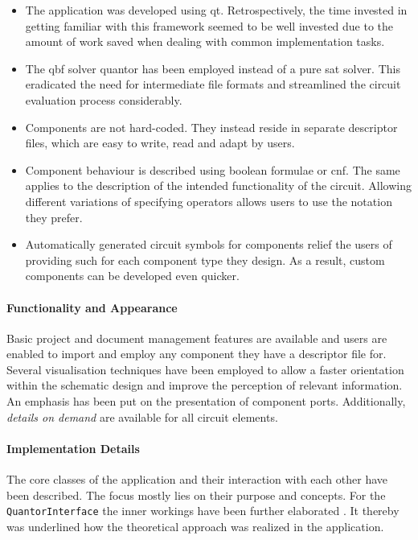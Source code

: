 	 \begin{itemize}
	 
	 \item The application was developed using \gls{qt}.
	 	Retrospectively, the time invested in getting familiar with this framework seemed to be well invested due to the amount of work saved when dealing with common implementation tasks.
	 	
	 \item The \gls{qbf} solver \gls{quantor} has been employed instead of a pure \gls{sat} solver.
	 	This eradicated the need for intermediate file formats and streamlined the circuit evaluation process considerably.
	 
	 \item Components are not hard-coded.
	 	They instead reside in separate descriptor files, which are easy to write, read and adapt by users.
	 	
	 \item Component behaviour is described using boolean formulae or \gls{cnf}.
	 The same applies to the description of the intended functionality of the circuit.
	 Allowing different variations of specifying operators allows users to use the notation they prefer.
	 		 	
	 \item Automatically generated circuit symbols for components relief the users of providing such for each component type they design.
	 As a result, custom components can be developed even quicker.
	 
	 \end{itemize}
	
	\paragraph{Functionality and Appearance}
	Basic project and document management features are available and users are enabled to import and employ any component they have a descriptor file for.
	Several visualisation techniques have been employed to allow a faster orientation within the schematic design and improve the perception of relevant information.
	An emphasis has been put on the presentation of component ports.
	Additionally, \emph{details on demand} are available for all circuit elements.
	
	\paragraph{Implementation Details}
	The core classes of the application and their interaction with each other have been described.
	The focus mostly lies on their purpose and concepts.
	For the \texttt{QuantorInterface} the inner workings have been further elaborated . 
	It thereby was underlined how the theoretical approach was realized in the application.
	
